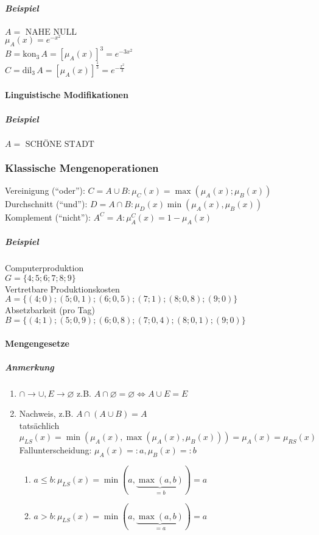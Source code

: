 \documentclass[a4paper]{scrartcl}
\begin{document}
\subparagraph{Beispiel} $A = \text{ NAHE NULL}$\\
$\mu_A (x) = e^{-x^2}$\\
$B= \text{kon}_3 \, A = [\mu_A (x) ]^3 = e^{-3x^2}$\\
$C = \text{dil}_3 \, A = [\mu_A (x) ]^{\frac{1}{3}} = e^{-\frac{x^2}{3}}$

\paragraph{Linguistische Modifikationen}
\subparagraph{Beispiel} $A = \text{ SCHÖNE STADT}$

\subsubsection{Klassische Mengenoperationen}
Vereinigung ("`oder"'): $C = A \cup B : \mu_C (x) = \max(\mu_A(x);\mu_B(x))$\\
Durchschnitt ("`und"'): $D = A \cap B : \mu_D (x) \min(\mu_A(x),\mu_B(x))$\\
Komplement ("`nicht"'): $A^C = A: \mu_A^C (x) = 1 - \mu_A(x)$

\subparagraph{Beispiel} Computerproduktion\\
$G=\{ 4;5;6;7;8;9\}$\\
Vertretbare Produktionskosten
$A= \{ (4;0);(5;0,1);(6;0,5);(7;1);(8;0,8);(9;0)\}$\\
Absetzbarkeit (pro Tag)
$B= \{(4;1);(5;0,9);(6;0,8);(7;0,4);(8;0,1);(9;0)\}$

\paragraph{Mengengesetze}
\subparagraph{Anmerkung}
\begin{enumerate}
\item $\cap \rightarrow \cup, E \rightarrow \varnothing$
z.B. $A \cap \varnothing = \varnothing \Leftrightarrow A \cup E = E$
\item Nachweis, z.B. $A \cap (A \cup B) = A$\\
tatsächlich $\mu_{LS}(x) = \min (\mu_A (x), \max (\mu_A(x),\mu_B(x))) = \mu_A(x) = \mu_{RS}(x)$\\
Fallunterscheidung: $\mu_A (x) =: a, \mu_B (x) =:b$
	\begin{enumerate}
	\item $a \leq b : \mu_{LS}(x) = \min (a,\underbrace{\max (a,b)}_{=b} )  = a$
	\item $a > b: \mu_{LS} (x) = \min (a,\underbrace{\max (a,b)}_{=a} ) = a$
	\end{enumerate}
\end{enumerate}
\end{document}
